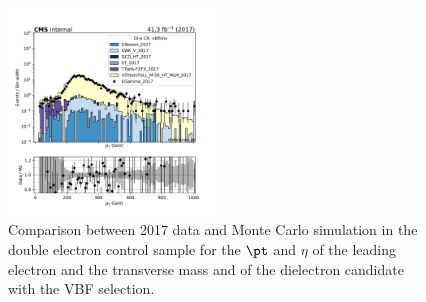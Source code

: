 \begin{figure}[htbp]
\begin{center}
        \includegraphics[width=0.49\textwidth]{fig/datamc/cr_2e_vbf/cr_2e_vbf_dielectron_pt_losf_2017.pdf}
    \end{center}
    \caption{Comparison between 2017 data and Monte Carlo simulation in the double electron control sample for
        the $\pt$ and $\eta$ of the leading electron and the transverse mass and \pt of the dielectron candidate with the VBF selection.}
    \label{fig:DE2_vbfhinv_2017}
\end{figure}

